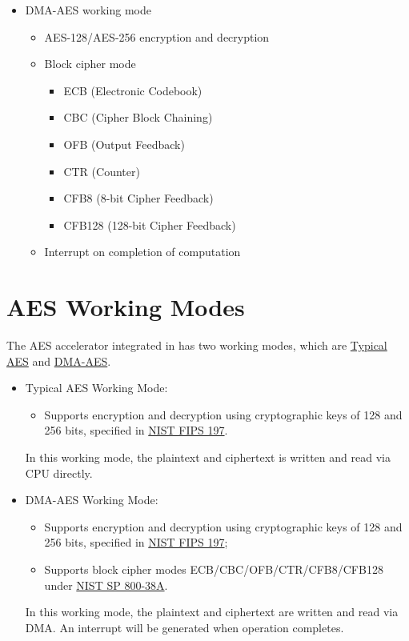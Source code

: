 \documentclass[main\_\_EN.tex]{subfiles}
\begin{document}
    \begin{itemize}
    \item DMA-AES working mode
        \begin{itemize}
            \item AES-128/AES-256 encryption and decryption
            \item Block cipher mode
                \begin{itemize}
                    \item ECB (Electronic Codebook)
                    \item CBC (Cipher Block Chaining)
                    \item OFB (Output Feedback)
                    \item CTR (Counter)
                    \item CFB8 (8-bit Cipher Feedback)
                    \item CFB128 (128-bit Cipher Feedback)
                \end{itemize}
            \item Interrupt on completion of computation    
        \end{itemize}
    \end{itemize}


\section{AES Working Modes}

The AES accelerator integrated in \chipname{} has two working modes, which are \hyperref[sec:aes-typical-modes]{Typical AES} and \hyperref[sec:aes-dma-aes]{DMA-AES}.

\begin{itemize}
    \item Typical AES Working Mode: \begin{itemize}
        \item Supports encryption and decryption using cryptographic keys of 128 and 256 bits, specified in \href{https://nvlpubs.nist.gov/nistpubs/FIPS/NIST.FIPS.197.pdf}{NIST FIPS 197}.
    \end{itemize}
    In this working mode, the plaintext and ciphertext is written and read via CPU directly. 
    \item DMA-AES Working Mode: 
    \begin{itemize}
        \item Supports encryption and decryption using cryptographic keys of 128 and 256 bits, specified in \href{https://nvlpubs.nist.gov/nistpubs/FIPS/NIST.FIPS.197.pdf}{NIST FIPS 197}; 
        \item Supports block cipher modes ECB/CBC/OFB/CTR/CFB8/CFB128 under \href{https://nvlpubs.nist.gov/nistpubs/Legacy/SP/nistspecialpublication800-38a.pdf}{NIST SP 800-38A}.
    \end{itemize}
    In this working mode, the plaintext and ciphertext are written and read via DMA. An interrupt will be generated when operation completes.
\end{itemize}
\end{document}
